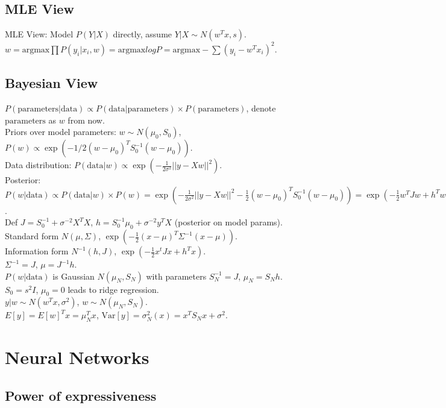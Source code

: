 \subsection*{MLE View}

MLE View: Model $P(Y|X)$ directly, assume $Y | X \sim N(w^T x, s)$.\\
$w = \text{argmax} \prod P(y_i|x_i, w) = \text{argmax} log P = \text{argmax} - \sum (y_i - w^T x_i)^2$.

\subsection*{Bayesian View}

$P(\text{parameters}|\text{data}) \propto P(\text{data}|\text{parameters}) \times P(\text{parameters})$, denote $\text{parameters}$ as $w$ from now.\\
Priors over model parameters: $w \sim N(\mu_0, S_0)$, $P(w) \propto \exp (-1/2 (w - \mu_0)^T S_0^{-1} (w - \mu_0))$.\\
Data distribution: $P(\text{data}|w) \propto \exp(-\frac{1}{2\sigma^2} ||y - X w||^2)$.\\
Posterior: $P(w|\text{data}) \propto P(\text{data}|w) \times P(w) = \exp(-\frac{1}{2\sigma^2} ||y - X w||^2 - \frac{1}{2}(w - \mu_0)^T S_0^{-1}(w-\mu_0)) = \exp(-\frac{1}{2} w^T J w + h^T w)$.\\
Def $J = S_0^{-1} + \sigma^{-2} X^T X$, $h = S_0^{-1}\mu_0 + \sigma^{-2} y^T X$ (posterior on model params).\\
Standard form $N(\mu, \Sigma)$, $\exp(-\frac{1}{2}(x-\mu)^T\Sigma^{-1}(x-\mu))$.\\
Information form $N^{-1}(h, J)$, $\exp(-\frac{1}{2}x^t J x + h^T x)$.\\
$\Sigma^{-1} = J$, $\mu = J^{-1} h$.\\
$P(w|\text{data})$ is Gaussian $N(\mu_N, S_N)$ with parameters $S_N^{-1} = J$, $\mu_N = S_N h$.\\
$S_0 = s^2I$, $\mu_0 = 0$ leads to ridge regression.\\
$y|w \sim N(w^T x, \sigma^2)$, $w \sim N(\mu_N, S_N)$.\\
$E[y] = E[w]^T x = \mu_N^T x$, $\text{Var}[y] = \sigma_N^2(x) = x^T S_N x + \sigma^2$.

\section{Neural Networks}

\subsection*{Power of expressiveness}

